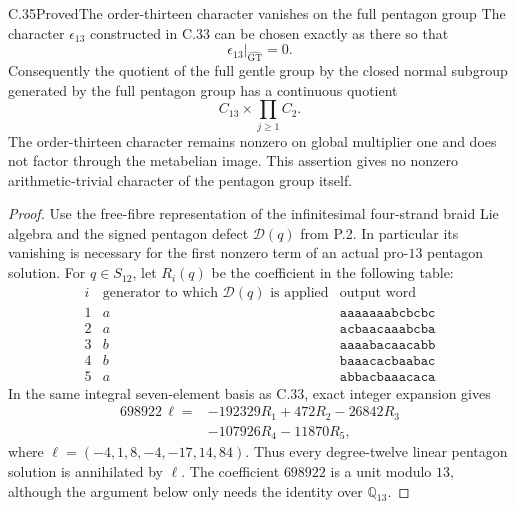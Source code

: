 \begin{statement}{C.35}{Proved}{The order-thirteen character vanishes on the full pentagon group}
The character $\epsilon_{13}$ constructed in C.33 can be
chosen exactly as there so that
\[
                    \epsilon_{13}|_{\widehat{\mathrm{GT}}}=0.
\]
Consequently the quotient of the full gentle group by the
closed normal subgroup generated by the full pentagon group
has a continuous quotient
\[
                    C_{13}\times\prod_{j\geq1}C_2.
\]
The order-thirteen character remains nonzero on global
multiplier one and does not factor through the metabelian
image.  This assertion gives no nonzero arithmetic-trivial
character of the pentagon group itself.
\end{statement}
\begin{proof}
Use the free-fibre representation of the infinitesimal
four-strand braid Lie algebra and the signed pentagon
defect $\mathcal D(q)$ from P.2.  In particular its
vanishing is necessary for the first nonzero term of
an actual pro-$13$ pentagon solution.
For $q\in S_{12}$, let $R_i(q)$ be the coefficient in the
following table:
\[
\begin{array}{c|c|l}
 i&\text{generator to which }\mathcal D(q)\text{ is applied}
       &\text{output word}\\ \hline
1&a&\mathtt{aaaaaaabcbcbc}\\
2&a&\mathtt{acbaacaaabcba}\\
3&b&\mathtt{aaaabacaacabb}\\
4&b&\mathtt{baaacacbaabac}\\
5&a&\mathtt{abbacbaaacaca}
\end{array}                                                     \tag{C35.1}
\]
In the same integral seven-element basis as C.33, exact
integer expansion gives
\[
\begin{split}
698922\,\ell={}&-192329R_1+472R_2-26842R_3\\
               &-107926R_4-11870R_5 ,
\end{split}                                                     \tag{C35.2}
\]
where $\ell=(-4,1,8,-4,-17,14,84)$.
Thus every degree-twelve linear pentagon solution is
annihilated by $\ell$.  The coefficient $698922$ is a
unit modulo $13$, although the argument below only
needs the identity over $\mathbb Q_{13}$.


\end{proof}
